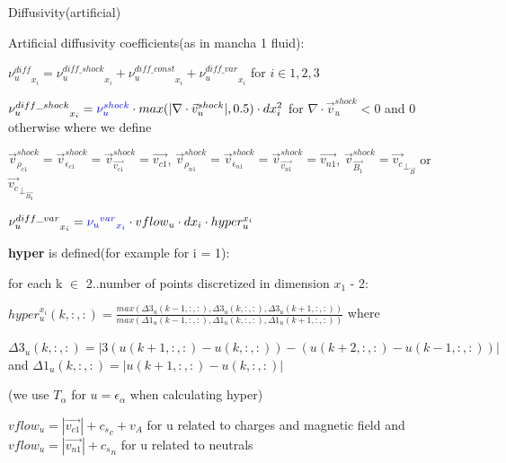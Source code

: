 \documentclass{beamer}
\begin{document}
\begin{frame}{Diffusivity(artificial)}

Artificial diffusivity coefficients(as in  mancha 1 fluid):

${\nu_u^{diff}}_{x_i} = {\nu_u^{diff\_shock}}_{x_i} + {\nu_u^{diff\_const}}_{x_i} +  {\nu_u^{diff\_var}}_{x_i} $ for $i \in 1,2,3$


${\nu_u^{diff\_shock}}_{x_i} = \textcolor{blue}{\nu_u^{shock}} \cdot max(|\nabla \cdot \vec{v}^{shock}_u|,0.5) \cdot dx_i^2$
for $\nabla \cdot \vec{v}^{shock}_u < 0$  and 0 otherwise where we define

$\vec{v}^{shock}_{\rho_{c1}} = \vec{v}^{shock}_{\epsilon_{c1}}= \vec{v}^{shock}_{\vec{v_{c1}}} = \vec{v_{c1}} $, 
$\vec{v}^{shock}_{\rho_{n1}} = \vec{v}^{shock}_{\epsilon_{n1}}= \vec{v}^{shock}_{\vec{v_{n1}}} = \vec{v_{n1}} $,
$\vec{v}^{shock}_{\vec{B_1}} = \vec{v_c}_{\perp_{\vec{B}}}$ or  $\vec{v_c}_{\perp_{\vec{B_0}}}$

${\nu_u^{diff\_var}}_{x_i}  = \textcolor{blue}{{{\nu_u}^{var}}_{x_i}} \cdot  vflow_u \cdot  dx_i \cdot  hyper_u^{x_i}$

\textbf{hyper} is defined(for example for i = 1):

for each k $\in$ 2..number of points discretized in dimension $x_1$ - 2:

$hyper_u^{x_i}(k,:,:)= \frac{max(\Delta3_u(k-1,:,:),\Delta3_u(k,:,:),\Delta3_u(k+1,:,:))}{max(\Delta1_u(k-1,:,:),\Delta1_u(k,:,:),\Delta1_u(k+1,:,:))}$ where

$\Delta3_u(k,:,:) = |3(u(k+1,:,:) - u(k,:,:)) - (u(k+2,:,:) - u(k-1,:,:)) | $ and $\Delta1_u(k,:,:) = |u(k+1,:,:) - u(k,:,:) | $ 

(we use $T_\alpha$ for $u = \epsilon_\alpha$ when calculating hyper)

$vflow_u = |\vec{v_{c1}}|+ {c_s}_c + v_A$ for u  related to charges and magnetic field and 
$vflow_u = |\vec{v_{n1}}|+ {c_s}_n $ for u  related to neutrals

\end{frame}
\end{document}
